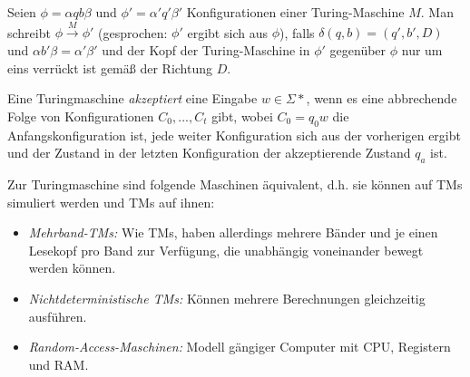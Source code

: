 \documentclass{cheat-sheet}
\begin{document}
\begin{definition}
Seien $\phi = \alpha q b \beta$ und $\phi' = \alpha ' q' \beta '$ Konfigurationen einer Turing-Maschine $M$. Man schreibt $\phi \xrightarrow{M} \phi'$ (gesprochen: $\phi'$ ergibt sich aus $\phi$), falls $\delta(q, b) = (q', b', D)$ und $\alpha b' \beta = \alpha' \beta'$ und der Kopf der Turing-Maschine in $\phi'$ gegenüber $\phi$ nur um eins verrückt ist gemäß der Richtung $D$.
\end{definition}

\begin{definition}
Eine Turingmaschine \emph{akzeptiert} eine Eingabe $w \in \Sigma*$, wenn es eine abbrechende Folge von Konfigurationen $C_{0}, ..., C_{t}$ gibt, wobei $C_{0} = q_{0}w$ die Anfangskonfiguration ist, jede weiter Konfiguration sich aus der vorherigen ergibt und der Zustand in der letzten Konfiguration der akzeptierende Zustand $q_{a}$ ist.
\end{definition}


\begin{bem}
Zur Turingmaschine sind folgende Maschinen äquivalent, d.h. sie können auf TMs simuliert werden und TMs auf ihnen:
  \begin{itemize}
    \item \emph{Mehrband-TMs:} Wie TMs, haben allerdings mehrere Bänder und je einen Lesekopf pro Band zur Verfügung, die unabhängig voneinander bewegt werden können.
    \item \emph{Nichtdeterministische TMs:} Können mehrere Berechnungen gleichzeitig ausführen.
    \item \emph{Random-Access-Maschinen:} Modell gängiger Computer mit CPU, Registern und RAM.
  \end{itemize}
\end{bem}
\end{document}
